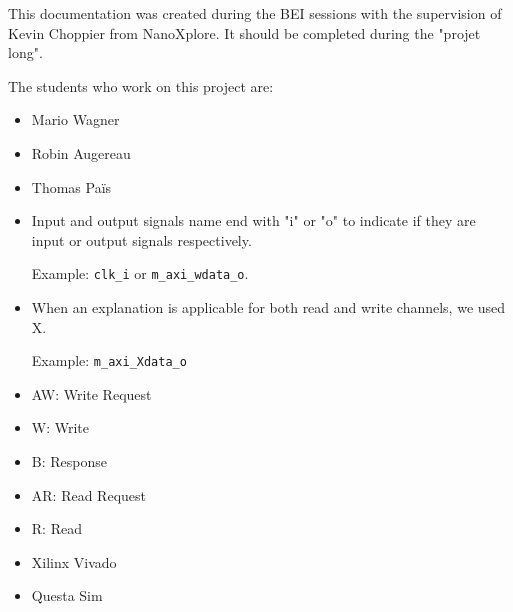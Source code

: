 


This documentation was created during the BEI sessions with the supervision of Kevin Choppier from NanoXplore. It should be completed during the "projet long". 

The students who work on this project are:

\begin{itemize}
    \item Mario Wagner
    \item Robin Augereau
    \item Thomas Païs
    
\end{itemize}



\begin{itemize}
    \item Input and output signals name end with "i" or "o" to indicate if they are input or output signals respectively.
    
    Example: \texttt{clk_i} or \texttt{m_axi_wdata_o}.


    \item When an explanation is applicable for both read and write channels, we used X.
    
    Example: \texttt{m_axi_Xdata_o}
\end{itemize}



\begin{itemize}
    \item AW: Write Request
    \item W: Write
    \item B: Response
    \item AR: Read Request
    \item R: Read
    
\end{itemize}

\begin{itemize}
    \item Xilinx Vivado
    \item Questa Sim
\end{itemize}


\printbibliography[heading=none]